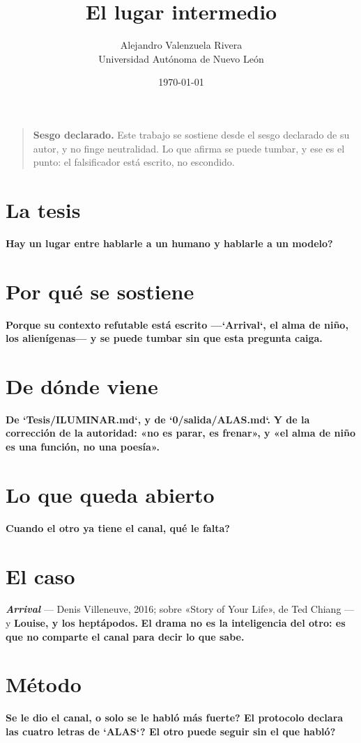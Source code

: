 \documentclass[11pt,a4paper]{article}
\title{El lugar intermedio}
\author{Alejandro Valenzuela Rivera\\\small Universidad Autónoma de Nuevo León}
\date{\today}
\begin{document}
\maketitle

\begin{quote}
\textbf{Sesgo declarado.} Este trabajo se sostiene desde el sesgo declarado de su autor, y no finge neutralidad. Lo que afirma se puede tumbar, y ese es el punto: el falsificador está escrito, no escondido.
\end{quote}

\section{La tesis}
\textbf{\textquestiondown{}Hay un lugar entre hablarle a un humano y hablarle a un modelo?}

\section{Por qué se sostiene}
\textbf{Porque su contexto refutable está escrito —`Arrival`, el alma de niño, los alienígenas— y se puede tumbar sin que esta pregunta caiga.}

\section{De dónde viene}
\textbf{De `Tesis/ILUMINAR.md`, y de `0/salida/ALAS.md`.} \textbf{Y de la corrección de la autoridad: «no es parar, es frenar», y «el alma de niño es una función, no una poesía».}

\section{Lo que queda abierto}
\textbf{Cuando el otro ya tiene el canal, \textquestiondown{}qué le falta?}

\section{El caso}
\textbf{\emph{Arrival}} — Denis Villeneuve, 2016; sobre «Story of Your Life», de Ted Chiang — y \textbf{Louise, y los heptápodos.} \textbf{El drama no es la inteligencia del otro: es que no comparte el canal para decir lo que sabe.}

\section{Método}
\textbf{\textquestiondown{}Se le dio el canal, o solo se le habló más fuerte? \textquestiondown{}El protocolo declara las cuatro letras de `ALAS`? \textquestiondown{}El otro puede seguir sin el que habló?}
\end{document}
